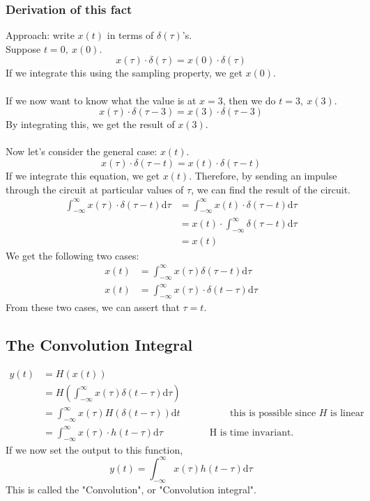 \documentclass[10pt]{article}
\begin{document}
\subsubsection*{Derivation of this fact}
Approach: write $x(t)$ in terms of $\delta(\tau)$'s.\\
Suppose $t = 0,\: x(0)$.
\[x(\tau) \cdot \delta(\tau) = x(0) \cdot \delta(\tau)\]
If we integrate this using the sampling property, we get $x(0)$.\\\\
If we now want to know what the value is at $x = 3$, then we do $t = 3,\:x(3)$.
\[x(\tau) \cdot \delta(\tau - 3) = x(3) \cdot \delta(\tau - 3)\]
By integrating this, we get the result of $x(3)$.\\\\
Now let's consider the general case: $x(t)$.
\[x(\tau) \cdot \delta(\tau - t) = x(t) \cdot \delta(\tau - t)\]
If we integrate this equation, we get $x(t)$.  Therefore, by sending an impulse through the circuit at particular values of $\tau$, we can find the result of the circuit.
\begin{align*}
    \int_{-\infty}^\infty x(\tau) \cdot \delta(\tau - t) \text{d}\tau &= \int_{-\infty}^\infty x(t) \cdot \delta(\tau - t) \text{d}\tau\\
    &= x(t) \cdot \int_{-\infty}^\infty \delta(\tau - t) \text{d}\tau\\
    &= x(t)
\end{align*}
We get the following two cases:
\begin{align*}
    x(t) &= \int_{-\infty}^\infty x(\tau) \delta(\tau - t) \text{d}\tau \\
    x(t) &= \int_{-\infty}^\infty x(\tau) \cdot \delta(t - \tau) \text{d}\tau
\end{align*}
From these two cases, we can assert that $\tau = t$.

\subsection*{The Convolution Integral}
\begin{align*}
    y(t) &= H(x(t))\\
    &= H\left(\int_{-\infty}^\infty x(\tau) \delta(t - \tau) \text{d}\tau\right)\\
    &= \int_{-\infty}^\infty x(\tau) H(\delta(t - \tau)) \text{d}t \hspace{2cm} \text{ this is possible since $H$ is linear}\\
    &= \int_{-\infty}^\infty x(\tau) \cdot h(t - \tau) \text{d}\tau \hspace{2cm} \text{H is time invariant.}
\end{align*}
If we now set the output to this function,
\[y(t) = \int_{-\infty}^\infty x(\tau) h(t - \tau) \text{d}\tau\]
This is called the "Convolution", or "Convolution integral".
\end{document}
